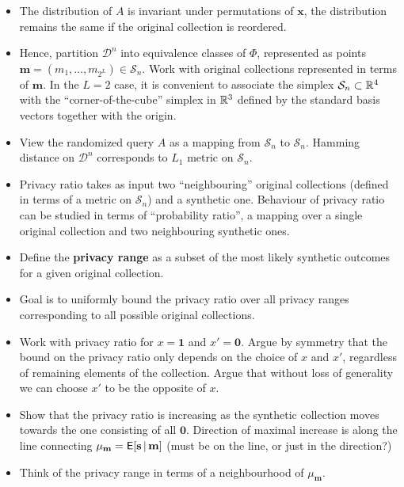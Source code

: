 \documentclass[11pt,draft]{article}
\newcommand{\Dsp}{\mathcal{D}}
\newcommand{\Ssp}{\mathcal{S}}
\newcommand{\xv}{\mathbf{x}}
\newcommand{\sv}{\mathbf{s}}
\newcommand{\mv}{\mathbf{m}}
\newcommand{\one}{\boldsymbol{1}}
\newcommand{\zero}{\boldsymbol{0}}
\begin{document}
\begin{itemize}
\item
The distribution of $A$ is invariant under permutations of $\xv$, \ie the
distribution remains the same if the original collection is reordered.

\item
Hence, partition $\Dsp^n$ into equivalence classes of $\Phi$, represented as
points $\mv = (m_1,\dots,m_{2^L}) \in \Ssp_n$.
Work with original collections represented in terms of $\mv$.
In the $L=2$ case, it is convenient to associate the simplex $\Ssp_n \cont
\R^4$ with the ``corner-of-the-cube'' simplex in $\mathbb{R}^3$ defined by the standard
basis vectors together with the origin.

\item
View the randomized query $A$ as a mapping from $\Ssp_n$ to $\Ssp_n$.
Hamming distance on $\Dsp^n$ corresponds to $L_1$ metric on $\Ssp_n$.

\item
Privacy ratio takes as input two ``neighbouring'' original collections (defined
in terms of a metric on $\Ssp_n$) and a synthetic one. Behaviour of privacy
ratio can be studied in terms of ``probability ratio'', a mapping over a single
original collection and two neighbouring synthetic ones.

\item
Define the \textbf{privacy range} as a subset of the most likely synthetic
outcomes for a given original collection.

\item
Goal is to uniformly bound the privacy ratio over all privacy ranges
corresponding to all possible original collections.

\item
Work with privacy ratio for $x = \one$ and $x' = \zero$. Argue by symmetry that
the bound on the privacy ratio only depends on the choice of $x$ and $x'$,
regardless of remaining elements of the collection.
Argue that without loss of generality we can choose $x'$ to be the opposite of
$x$.

\item
Show that the privacy ratio is increasing as the synthetic collection moves
towards the one consisting of all $\zero$.
Direction of maximal increase is along the line connecting $\mu_{\mv} =
\EP[\sv\given\mv]$ (must be on the line, or just in the direction?)

\item
Think of the privacy range in terms of a neighbourhood of $\mu_{\mv}$.
\end{itemize}
\end{document}
